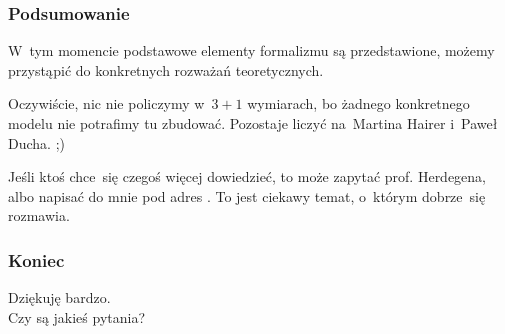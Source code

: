 \documentclass[10pt,t]{beamer}
\begin{document}
\begin{frame}
  \frametitle{Podsumowanie}


  W~tym momencie podstawowe elementy formalizmu są przedstawione, możemy
  przystąpić do konkretnych rozważań teoretycznych.

  Oczywiście, nic nie policzymy w~$3 + 1$ wymiarach, bo żadnego konkretnego
  modelu nie potrafimy tu zbudować. Pozostaje liczyć na~Martina Hairer
  i~Paweł Ducha. ;)

  Jeśli ktoś chce~się czegoś więcej dowiedzieć, to może zapytać prof.
  Herdegena, albo napisać do mnie pod adres \email. To jest ciekawy temat,
  o~którym dobrze~się rozmawia.

\end{frame}





\begin{frame}
  \frametitle{Koniec}

  \vspace{7em}


  \begin{center}

    \Large

    Dziękuję bardzo. \\
    Czy są jakieś pytania?

  \end{center}

\end{frame}










\appendix
\end{document}

